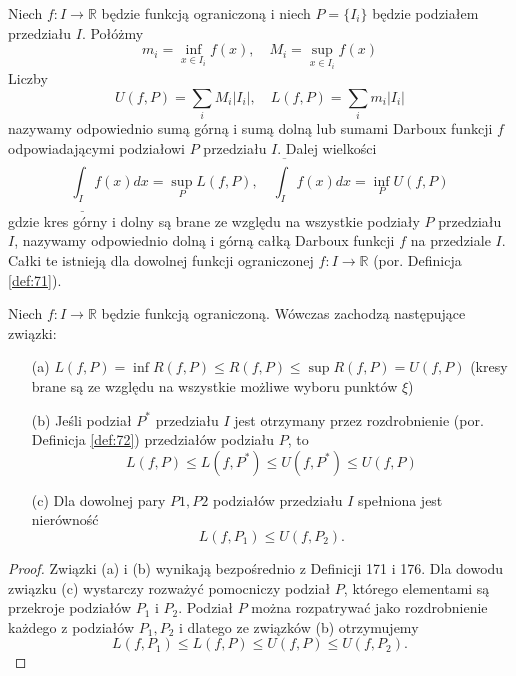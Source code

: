 \documentclass[leqno]{article}
\begin{document}
\begin{justify}
\begin{defn}
    Niech $f : I \to \mathbb{R}$ będzie funkcją ograniczoną i niech $P = \{I_i\}$ będzie podziałem przedziału $I$. Połóżmy
    \[
        m_i = \inf_{x \in I_i}f(x), \quad M_i = \sup_{x \in I_i}f(x)
    \]
    Liczby
    \[
        U(f, P) = \sum_{i}M_i |I_i|, \quad L(f, P) = \sum_{i}m_i |I_i|
    \]
    nazywamy odpowiednio sumą górną i sumą dolną lub sumami Darboux funkcji $f$ odpowiadającymi podziałowi $P$ przedziału $I$. Dalej wielkości
    \[
        \underline{\int_{I}}f(x)dx = \sup_{P}L(f, P), \quad \overline{\int_{I}}f(x)dx = \inf_{P}U(f, P)
    \]
    gdzie kres górny i dolny są brane ze względu na wszystkie podziały $P$ przedziału $I$, nazywamy odpowiednio dolną i górną całką Darboux funkcji
    $f$ na przedziale $I$. Całki te istnieją dla dowolnej funkcji ograniczonej $f : I \to \mathbb{R}$ (por. Definicja \ref{def:71}).
\end{defn}

\begin{lemat}
{
    Niech $f : I \to \mathbb{R}$ będzie funkcją ograniczoną. Wówczas zachodzą następujące związki:
    \begin{itemize}
        \item [(a)]
            $L(f, P) = \inf R(f, P) \leqslant R(f, P) \leqslant \sup R(f, P) = U(f, P)$ (kresy brane są ze względu na wszystkie możliwe wyboru punktów $\xi$)
        \item [(b)]
            Jeśli podział $P^*$ przedziału $I$ jest otrzymany przez rozdrobnienie (por. Definicja \ref{def:72}) przedziałów podziału $P$, to
            \[
                L(f, P) \leqslant L(f, P^*) \leqslant U(f, P^*) \leqslant U(f, P)
            \]
        \item [(c)]
            Dla dowolnej pary $P1, P2$ podziałów przedziału $I$ spełniona jest nierówność 
            \[
                L(f, P_1) \leqslant U(f, P_2).
            \]
    \end{itemize}
}
\end{lemat}

\begin{proof}
    Związki (a) i (b) wynikają bezpośrednio z Definicji 171 i 176.
    Dla dowodu związku (c) wystarczy rozważyć pomocniczy podział $P$, którego elementami są przekroje podziałów $P_1$ i $P_2$. Podział $P$ można
    rozpatrywać jako rozdrobnienie każdego z podziałów $P_1, P_2$ i dlatego ze związków (b) otrzymujemy 
    \[
        L(f, P_1) \leqslant L(f, P) \leqslant U(f, P) \leqslant U(f, P_2).
    \]
\end{proof}


\end{justify}
\end{document}
